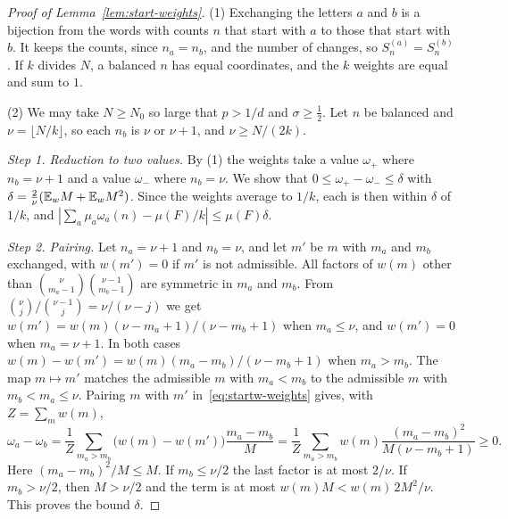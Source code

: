 \begin{proof}[Proof of Lemma~\ref{lem:start-weights}]
(1) Exchanging the letters $a$ and $b$ is a bijection from the words with counts
$n$ that start with $a$ to those that start with $b$. It keeps the counts, since
$n_a=n_b$, and the number of changes, so $S^{(a)}_n=S^{(b)}_n$. If $k$ divides
$N$, a balanced $n$ has equal coordinates, and the $k$ weights are equal and sum
to $1$.

(2) We may take $N\ge N_0$ so large that $p>1/d$ and $\sigma\ge\frac12$. Let $n$
be balanced and $\nu=\lfloor N/k\rfloor$, so each $n_b$ is $\nu$ or $\nu+1$, and
$\nu\ge N/(2k)$.

\emph{Step 1. Reduction to two values.} By (1) the weights take a value $\omega_+$
where $n_b=\nu+1$ and a value $\omega_-$ where $n_b=\nu$. We show that
$0\le\omega_+-\omega_-\le\delta$ with $\delta=\frac2\nu(\mathbb E_wM+\mathbb E_wM^2)$. Since
the weights average to $1/k$, each is then within $\delta$ of $1/k$, and
$|\sum_a\mu_a\omega_a(n)-\mu(F)/k|\le\mu(F)\delta$.

\emph{Step 2. Pairing.} Let $n_a=\nu+1$ and $n_b=\nu$, and let $m'$ be $m$ with
$m_a$ and $m_b$ exchanged, with $w(m')=0$ if $m'$ is not admissible. All factors
of $w(m)$ other than $\binom{\nu}{m_a-1}\binom{\nu-1}{m_b-1}$ are symmetric in
$m_a$ and $m_b$. From $\binom\nu j/\binom{\nu-1}j=\nu/(\nu-j)$ we get
$w(m')=w(m)(\nu-m_a+1)/(\nu-m_b+1)$ when $m_a\le\nu$, and $w(m')=0$ when
$m_a=\nu+1$. In both cases $w(m)-w(m')=w(m)(m_a-m_b)/(\nu-m_b+1)$ when
$m_a>m_b$. The map $m\mapsto m'$ matches the admissible $m$ with $m_a<m_b$ to
the admissible $m$ with $m_b<m_a\le\nu$. Pairing $m$ with $m'$
in~\eqref{eq:startw-weights} gives, with $Z=\sum_mw(m)$,
\[
 \omega_a-\omega_b=\frac1Z\sum_{m_a>m_b}\bigl(w(m)-w(m')\bigr)\frac{m_a-m_b}M
 =\frac1Z\sum_{m_a>m_b}w(m)\frac{(m_a-m_b)^2}{M(\nu-m_b+1)}\ge0.
\]
Here $(m_a-m_b)^2/M\le M$. If $m_b\le\nu/2$ the last factor is at most $2/\nu$. If
$m_b>\nu/2$, then $M>\nu/2$ and the term is at most $w(m)M<w(m)\,2M^2/\nu$. This
proves the bound $\delta$.


\end{proof}
